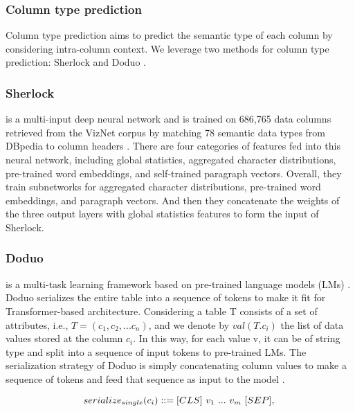 
\subsubsection{Column type prediction}
Column type prediction aims to predict the semantic type of each column by considering intra-column context. We leverage two methods for column type prediction: Sherlock \cite{hulsebos_sherlock_2019} and Doduo \cite{suhara_annotating_2022}.

\subsubsection{Sherlock} is a multi-input deep neural network and is trained on 686,765 data columns retrieved from the VizNet corpus by matching 78 semantic data types from DBpedia to column headers \cite{hulsebos_sherlock_2019}. There are four categories of features fed into this neural network, including global statistics, aggregated character distributions, pre-trained word embeddings, and self-trained paragraph vectors. Overall, they train subnetworks for aggregated character distributions, pre-trained word embeddings, and paragraph vectors. And then they concatenate the weights of the three output layers with global statistics features to form the input of Sherlock. 

\subsubsection{Doduo} is a multi-task learning framework based on pre-trained language models (LMs) \cite{suhara_annotating_2022}. Doduo serializes the entire table into a sequence of tokens to make it fit for Transformer-based architecture. Considering a table T consists of a set of attributes, i.e., $T= (c_1, c_2,... c_n)$, and we denote by  $val(T.c_i)$ the list of data values stored at the column $c_i$. In this way, for each value v, it can be of string type and split into a sequence of input tokens to pre-trained LMs. The serialization strategy of Doduo is simply concatenating column values to make a sequence of tokens and feed that sequence as input to the model \cite{suhara_annotating_2022}. 

\begin{equation}
    serialize_{single}(c_i) ::= [CLS]\ v_1\ ...\ v_m\ [SEP], \\ 
\end{equation}

